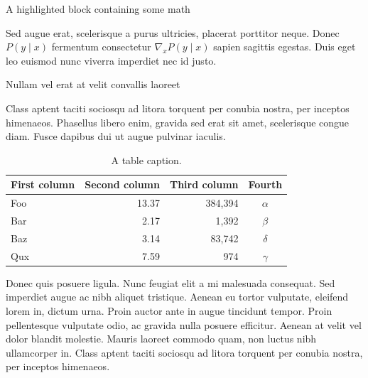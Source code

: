 \begin{frame}[t]
\begin{columns}[t]
\begin{column}{\colwidth}
\begin{exampleblock}{A highlighted block containing some math}

    Sed augue erat, scelerisque a purus ultricies, placerat porttitor neque.
    Donec $P(y \mid x)$ fermentum consectetur $\nabla_x P(y \mid x)$ sapien
    sagittis egestas. Duis eget leo euismod nunc viverra imperdiet nec id
    justo.

  \end{exampleblock}

  \begin{block}{Nullam vel erat at velit convallis laoreet}

    Class aptent taciti sociosqu ad litora torquent per conubia nostra, per
    inceptos himenaeos. Phasellus libero enim, gravida sed erat sit amet,
    scelerisque congue diam. Fusce dapibus dui ut augue pulvinar iaculis.

    \begin{table}
      \centering
      \begin{tabular}{l r r c}
        \toprule
        \textbf{First column} & \textbf{Second column} & \textbf{Third column} & \textbf{Fourth} \\
        \midrule
        Foo & 13.37 & 384,394 & $\alpha$ \\
        Bar & 2.17 & 1,392 & $\beta$ \\
        Baz & 3.14 & 83,742 & $\delta$ \\
        Qux & 7.59 & 974 & $\gamma$ \\
        \bottomrule
      \end{tabular}
      \caption{A table caption.}
    \end{table}

    Donec quis posuere ligula. Nunc feugiat elit a mi malesuada consequat. Sed
    imperdiet augue ac nibh aliquet tristique. Aenean eu tortor vulputate,
    eleifend lorem in, dictum urna. Proin auctor ante in augue tincidunt
    tempor. Proin pellentesque vulputate odio, ac gravida nulla posuere
    efficitur. Aenean at velit vel dolor blandit molestie. Mauris laoreet
    commodo quam, non luctus nibh ullamcorper in. Class aptent taciti sociosqu
    ad litora torquent per conubia nostra, per inceptos himenaeos.


\end{block}
\end{column}
\end{columns}
\end{frame}
